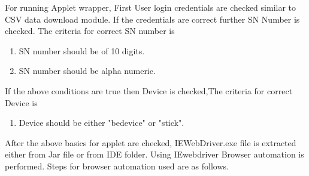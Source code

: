 \documentclass[article,type=msc,colorback,accentcolor=tud9c,twoside,11pt]{tudthesis}
\begin{document}
For running Applet wrapper, First User login credentials are checked similar to CSV data download module. If the credentials are correct further SN Number is checked. The criteria for correct SN number is
\begin{enumerate}
\item SN number should be of 10 digits.
\item SN number should be alpha numeric.
\end{enumerate}
If the above conditions are true then Device is checked,The criteria for correct Device is 
\begin{enumerate}
\item Device should be either "bedevice" or "stick".
\end{enumerate}
After the above basics for applet are checked, IEWebDriver.exe file is extracted either from Jar file or from IDE folder. Using IEwebdriver Browser automation is performed. Steps for browser automation used are as follows.
\end{document}
